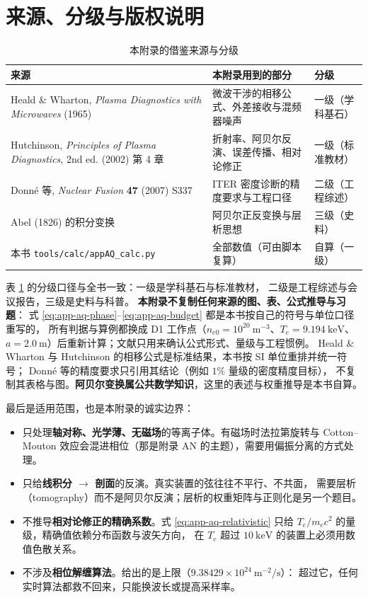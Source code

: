 \section{来源、分级与版权说明}
\label{sec:app-aq-source}

\begingroup\small
\begin{table}[htbp]
\centering
\small
\caption{本附录的借鉴来源与分级}
\label{tab:app-aq-source}
\setlength{\tabcolsep}{4pt}
\begin{tabular}{p{4.6cm}p{4.4cm}p{4.6cm}}
\toprule
来源 & 本附录用到的部分 & 分级 \\
\midrule
Heald \& Wharton, \textit{Plasma Diagnostics with Microwaves} (1965) & 微波干涉的相移公式、外差接收与混频器噪声 & 一级（学科基石） \\
Hutchinson, \textit{Principles of Plasma Diagnostics}, 2nd ed. (2002) 第 4 章 & 折射率、阿贝尔反演、误差传播、相对论修正 & 一级（标准教材） \\
Donné 等, \textit{Nuclear Fusion} \textbf{47} (2007) S337 & ITER 密度诊断的精度要求与工程口径 & 二级（工程综述） \\
Abel (1826) 的积分变换 & 阿贝尔正反变换与层析思想 & 三级（史料） \\
本书 \texttt{tools/\allowbreak{}calc/\allowbreak{}appAQ\_calc.py} & 全部数值（可由脚本复算） & 自算（一级） \\
\bottomrule
\end{tabular}
\end{table}

表 \ref{tab:app-aq-source} 的分级口径与全书一致：一级是学科基石与标准教材，
二级是工程综述与会议报告，三级是史料与科普。
\textbf{本附录不复制任何来源的图、表、公式推导与习题}：
式 \eqref{eq:app-aq-phase}--\eqref{eq:app-aq-budget} 都是本书按自己的符号与单位口径重写的，
所有判据与算例都换成 D1 工作点（$n_{e0} = 10^{20}\ \mathrm{m^{-3}}$、$T_e = 9.194\ \mathrm{keV}$、
$a = 2.0\ \mathrm{m}$）后重新计算；文献只用来确认公式形式、量级与工程惯例。
Heald \& Wharton 与 Hutchinson 的相移公式是标准结果，本书按 SI 单位重排并统一符号；
Donné 等的精度要求只引用其结论（例如 $1\%$ 量级的密度精度目标），
不复制其表格与图。\textbf{阿贝尔变换属公共数学知识}，这里的表述与权重推导是本书自算。

最后是适用范围，也是本附录的诚实边界：

\begin{itemize}
\item 只处理\textbf{轴对称、光学薄、无磁场}的等离子体。有磁场时法拉第旋转与
Cotton--Mouton 效应会混进相位（那是附录 AN 的主题），需要用偏振分离的方式处理。
\item 只给\textbf{线积分 $\to$ 剖面}的反演。真实装置的弦往往不平行、不共面，
需要层析（tomography）而不是阿贝尔反演；层析的权重矩阵与正则化是另一个题目。
\item 不推导\textbf{相对论修正的精确系数}。式 \eqref{eq:app-aq-relativistic}
只给 $T_e/m_ec^2$ 的量级，精确值依赖分布函数与波矢方向，
在 $T_e$ 超过 $10\ \mathrm{keV}$ 的装置上必须用数值色散关系。
\item 不涉及\textbf{相位解缠算法}。给出的是上限（$9.38429\times10^{24}\ \mathrm{m^{-2}/s}$）：
超过它，任何实时算法都救不回来，只能换波长或提高采样率。
\end{itemize}

